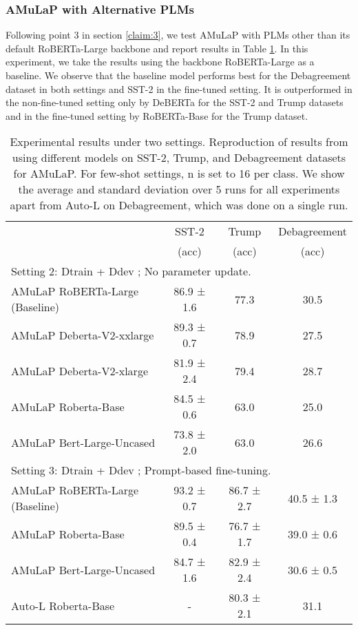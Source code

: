 \subsubsection{AMuLaP with Alternative PLMs}

Following point 3 in section \ref{claim:3}, we test AMuLaP with PLMs other than its default RoBERTa-Large backbone and report results in Table \ref{table:othermodels}. In this experiment, we take the results using the backbone RoBERTa-Large as a baseline. We observe that the baseline model performs best for the Debagreement dataset in both settings and SST-2 in the fine-tuned setting. It is outperformed in the non-fine-tuned setting only by DeBERTa for the SST-2 and Trump datasets and in the fine-tuned setting by RoBERTa-Base for the Trump dataset.

\begin{table}[h!]
\centering
{%
\begin{tabular}{|l| c c c|}

 \hline
  & SST-2 & Trump & Debagreement\\ 
  & (acc) & (acc) & (acc)\\[0.5ex] 
 \hline
 \multicolumn{4}{|l|}{Setting 2: Dtrain + Ddev ; No parameter update.} \\
 \hline
 AMuLaP RoBERTa-Large (Baseline) & 86.9 ± 1.6 & 77.3 & 30.5 \\
 AMuLaP Deberta-V2-xxlarge & 89.3 ± 0.7 & 78.9 & 27.5 \\
 AMuLaP Deberta-V2-xlarge & 81.9 ± 2.4 & 79.4 & 28.7 \\
 AMuLaP Roberta-Base & 84.5 ± 0.6 & 63.0 & 25.0 \\
 AMuLaP Bert-Large-Uncased & 73.8 ± 2.0 & 63.0 & 26.6 \\
 \hline
 \multicolumn{4}{|l|}{Setting 3: Dtrain + Ddev ; Prompt-based fine-tuning.} \\
 \hline
 AMuLaP RoBERTa-Large (Baseline) & 93.2 ± 0.7 & 86.7 ± 2.7 & 40.5 ± 1.3 \\
 AMuLaP Roberta-Base & 89.5 ± 0.4 & 76.7 ± 1.7 & 39.0 ± 0.6 \\
 AMuLaP Bert-Large-Uncased & 84.7 ± 1.6 & 82.9 ± 2.4 & 30.6 ± 0.5 \\
 
 Auto-L Roberta-Base & - & 80.3 ± 2.1 & 31.1\\ [0.1ex] 
 \hline
\end{tabular}}
\caption{Experimental results under two settings. Reproduction of results from using different models on SST-2, Trump, and Debagreement datasets for AMuLaP. For few-shot settings, n is set to 16 per class. We show the average and standard deviation over 5 runs for all experiments apart from Auto-L on Debagreement, which was done on a single run.}
\label{table:othermodels}
\end{table}


